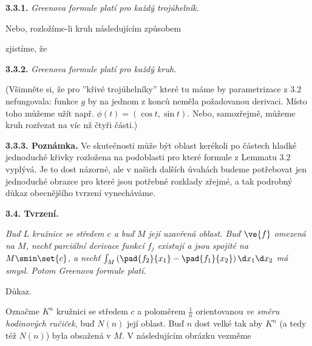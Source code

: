 \documentclass[12pt]{article}
\begin{document}
\medskip

{\bf 3.3.1.} {\em  Greenova formule platí pro každý trojúhelník.}

\medskip

Nebo, rozložíme-li kruh následujícím způsobem

\vskip1mm

\centerline{
}

\vskip3mm

 \noindent zjistíme, že 
 
 \medskip

{\bf 3.3.2.} {\em  Greenova formule platí pro každý kruh.}



 

\noindent(Všimněte si, že pro ''křivé trojúhelníky'' které tu máme by parametrizace z 3.2 nefungovala: funkce $g$ by na jednom z konců neměla požadovanou derivaci. Místo toho můžeme užít např. $\phi(t)=(\cos t, \sin t)$. Nebo, samozřejmě, můžeme kruh rozřezat na víc nž čtyři části.)

\medskip

{\bf 3.3.3. Poznámka.} Ve skutečnosti může být oblast kerékoli po částech hladké jednoduché křivky rozložena na podoblasti pro které formule z  Lemmatu 3.2 vyplývá.  Je to dost názorné, ale v našich dalších úvahách budeme potřebovat jen jednoduché obrazce pro které jsou potřebné rozklady zřejmé, a tak podrobný důkaz obecnějšího tvrzení vynecháváme.





\bigskip

{\bf 3.4. Tvrzení.} {\em Buď $L$ kružnice se středem $c$ a buď $M$ její uzavřená oblast. Buď $\ve{f}$ omezená na $M$, nechť parciální derivace  funkcí $f_j$ existují a jsou spojité na $M\smin\set{c}$, a nechť
$\int_M\left(\pad{f_2}{x_1}-\pad{f_1}{x_2}\right)\d x_1\d x_2$ má smysl. Potom Greenova formule platí.

Důkaz.} 
Označme $K^n$ kružnici se středem  $c$ a poloměrem $\frac1n$ orientovanou {\em ve směru hodinových ručiček}, buď $N(n)$ její oblast. Buď  $n$ dost velké tak aby $K^n$  (a tedy též $N(n)$) byla obsažená v $M$. V následujícím obrázku vezměme
\end{document}
